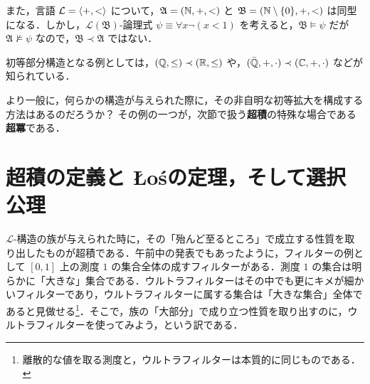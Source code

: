 \documentclass[a4j]{jsarticle}
\newcommand{\Los}{{\L}o\'{s}}
\begin{document}
また，言語 $\mathcal{L} = \braket{ +, < }$ について，$\mathfrak{A} = (\mathbb{N}, +, <)$ と $\mathfrak{B} = (\mathbb{N} \setminus \{0\}, +, <)$ は同型になる．しかし，$\mathcal{L}(\mathfrak{B})$-論理式 $\psi \equiv \forall x \neg (x < 1)$ を考えると，$\mathfrak{B} \models \psi$ だが $\mathfrak{A} \not\models \psi$ なので，$\mathfrak{B} \prec \mathfrak{A}$ ではない．

初等部分構造となる例としては，$(\mathbb{Q}, \leq) \prec (\mathbb{R}, \leq)$ や，$(\bar{\mathbb{Q}}, +, \cdot) \prec (\mathbb{C}, +, \cdot)$ などが知られている．

より一般に，何らかの構造が与えられた際に，その非自明な初等拡大を構成する方法はあるのだろうか？
その例の一つが，次節で扱う{\bfseries 超積}の特殊な場合である{\bfseries 超冪}である．

\section{超積の定義と \Los の定理，そして選択公理}
$\mathcal{L}$-構造の族が与えられた時に，その「殆んど至るところ」で成立する性質を取り出したものが超積である．午前中の発表でもあったように，フィルターの例として $[0,1]$ 上の測度 $1$ の集合全体の成すフィルターがある．測度 $1$ の集合は明らかに「大きな」集合である．ウルトラフィルターはその中でも更にキメが細かいフィルターであり，ウルトラフィルターに属する集合は「大きな集合」全体であると見做せる\footnote{離散的な値を取る測度と，ウルトラフィルターは本質的に同じものである．}．そこで，族の「大部分」で成り立つ性質を取り出すのに，ウルトラフィルターを使ってみよう，という訳である．
\end{document}
